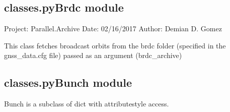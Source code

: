 \documentclass[letterpaper,10pt,english]{sphinxmanual}
\begin{document}
\subsection{classes.pyBrdc module}
\label{\detokenize{classes:module-classes.pyBrdc}}\label{\detokenize{classes:classes-pybrdc-module}}
\sphinxAtStartPar
Project: Parallel.Archive
Date: 02/16/2017
Author: Demian D. Gomez

\sphinxAtStartPar
This class fetches broadcast orbits from the brdc folder (specified in the
gnss\_data.cfg file) passed as an argument (brdc\_archive)


\subsection{classes.pyBunch module}
\label{\detokenize{classes:module-classes.pyBunch}}\label{\detokenize{classes:classes-pybunch-module}}
\sphinxAtStartPar
Bunch is a subclass of dict with attribute\sphinxhyphen{}style access.

\begin{sphinxVerbatim}[commandchars=\\\{\}]
  
  
\PYG{p}{[}\PYG{p}{]}  
  
  \PYG{p}{[}\PYG{p}{]}
\end{sphinxVerbatim}
\end{document}
